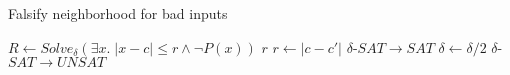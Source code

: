 \begin{algorithm}
  \centering
  \caption{Falsify neighborhood for bad inputs}
  \begin{algorithmic}[1]
            \State $R \gets Solve_{\delta}(\exists x. \; |x - c| \le r \land \neg P(x))$
                \State \Return $r$
                    \State $r \gets |c - c'|$
                    \Comment $\delta$-$SAT \to SAT$
                \Else
                    \State $\delta \gets \delta / 2$
                    \Comment $\delta$-$SAT \to UNSAT$
                \EndIf
            \EndIf
        \EndWhile
    \EndProcedure
  \end{algorithmic}
\end{algorithm}


